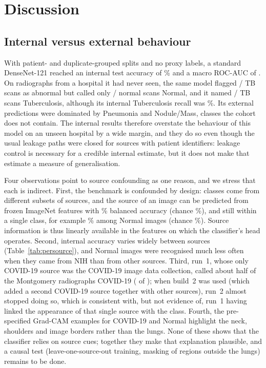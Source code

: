 \section{Discussion}
\label{sec:discussion}

\subsection{Internal versus external behaviour}
With patient- and duplicate-grouped splits and no proxy labels, a standard DenseNet-121 reached an internal test accuracy of \RTestAcc\% and a macro ROC-AUC of \RTestMacroAUC. On radiographs from a hospital it had never seen, the same model flagged \RExtSensK/\RExtSensN{} TB scans as abnormal but called only \RExtSpecK/\RExtSpecN{} normal scans Normal, and it named \RExtTBK/\RExtTBN{} TB scans Tuberculosis, although its internal Tuberculosis recall was \RRecallTB\%. Its external predictions were dominated by Pneumonia and Nodule/Mass, classes the cohort does not contain. The internal results therefore overstate the behaviour of this model on an unseen hospital by a wide margin, and they do so even though the usual leakage paths were closed for sources with patient identifiers: leakage control is necessary for a credible internal estimate, but it does not make that estimate a measure of generalisation.

Four observations point to source confounding as one reason, and we stress that each is indirect. First, the benchmark is confounded by design: classes come from different subsets of sources, and the source of an image can be predicted from frozen ImageNet features with \RProbeImgBalAcc\% balanced accuracy (chance \RProbeImgChance\%), and still within a single class, for example \RProbeImgWithinNormal\% among Normal images (chance \RProbeImgWithinNormalChance\%). Source information is thus linearly available in the features on which the classifier's head operates. Second, internal accuracy varies widely between sources (Table~\ref{tab:persource}), and Normal images were recognised much less often when they came from NIH than from other sources. Third, run~1, whose only COVID-19 source was the COVID-19 image data collection, called about half of the Montgomery radiographs COVID-19 (\RRunOneExtCovidCalls{} of \RNExternal);
 when build~2 was used (which added a second COVID-19 source together with other sources), run~2 almost stopped doing so, which is consistent with, but not evidence of, run~1 having linked the appearance of that single source with the class. Fourth, the pre-specified Grad-CAM examples for COVID-19 and Normal highlight the neck, shoulders and image borders rather than the lungs. None of these shows that the classifier relies on source cues; together they make that explanation plausible, and a causal test (leave-one-source-out training, masking of regions outside the lungs) remains to be done.

